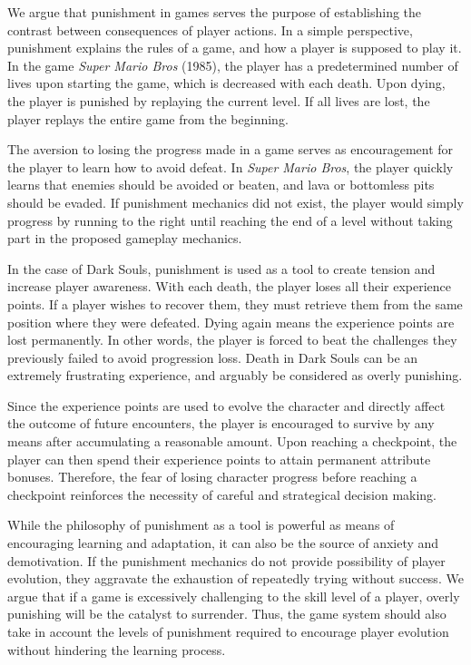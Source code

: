 We argue that punishment in games serves the purpose of establishing the contrast between consequences of player actions. In a simple perspective, punishment explains the rules of a game, and how a player is supposed to play it. In the game \emph{Super Mario Bros} (1985), the player has a predetermined number of lives upon starting the game, which is decreased with each death. Upon dying, the player is punished by replaying the current level. If all lives are lost, the player replays the entire game from the beginning.

The aversion to losing the progress made in a game serves as encouragement for the player to learn how to avoid defeat. In \emph{Super Mario Bros}, the player quickly learns that enemies should be avoided or beaten, and lava or bottomless pits should be evaded. If punishment mechanics did not exist, the player would simply progress by running to the right until reaching the end of a level without taking part in the proposed gameplay mechanics.

In the case of Dark Souls, punishment is used as a tool to create tension and increase player awareness. With each death, the player loses all their experience points. If a player wishes to recover them, they must retrieve them from the same position where they were defeated. Dying again means the experience points are lost permanently. In other words, the player is forced to beat the challenges they previously failed to avoid progression loss. Death in Dark Souls can be an extremely frustrating experience, and arguably be considered as overly punishing.

Since the experience points are used to evolve the character and directly affect the outcome of future encounters, the player is encouraged to survive by any means after accumulating a reasonable amount. Upon reaching a checkpoint, the player can then spend their experience points to attain permanent attribute bonuses. Therefore, the fear of losing character progress before reaching a checkpoint reinforces the necessity of careful and strategical decision making.

While the philosophy of punishment as a tool is powerful as means of encouraging learning and adaptation, it can also be the source of anxiety and demotivation. If the punishment mechanics do not provide possibility of player evolution, they aggravate the exhaustion of repeatedly trying without success. We argue that if a game is excessively challenging to the skill level of a player, overly punishing will be the catalyst to surrender. Thus, the game system should also take in account the levels of punishment required to encourage player evolution without hindering the learning process.


